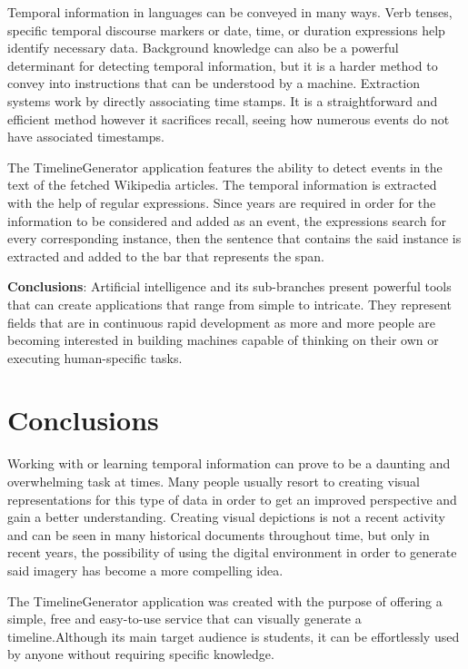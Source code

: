 \documentclass{report}
\begin{document}
Temporal information in languages can be conveyed in many ways. Verb tenses, specific temporal discourse markers or date, time, or duration expressions help identify necessary data. Background knowledge can also be a powerful determinant for detecting temporal information, but it is a harder method to convey into instructions that can be understood by a machine. Extraction systems work by directly associating time stamps. It is a straightforward and efficient method however it sacrifices recall, seeing how numerous events do not have associated timestamps.\par

The TimelineGenerator application features the ability to detect events in the text of the fetched Wikipedia articles. The temporal information is extracted with the help of regular expressions. Since years are required in order for the information to be considered and added as an event, the expressions search for every corresponding instance, then the sentence that contains the said instance is extracted and added to the bar that represents the span.\par

\textbf{Conclusions}: Artificial intelligence and its sub-branches present powerful tools that can create applications that range from simple to intricate. They represent fields that are in continuous rapid development as more and more people are becoming interested in building machines capable of thinking on their own or executing human-specific tasks.
\newpage

\chapter{Conclusions}
Working with or learning temporal information can prove to be a daunting and overwhelming task at times. Many people usually resort to creating visual representations for this type of data in order to get an improved perspective and gain a better understanding. Creating visual depictions is not a recent activity and can be seen in many historical documents throughout time, but only in recent years, the possibility of using the digital environment in order to generate said imagery has become a more compelling idea.\par

The TimelineGenerator application was created with the purpose of offering a simple, free and easy-to-use service that can visually generate a timeline.Although its main target audience is students, it can be effortlessly used by anyone without requiring specific knowledge.\par
\end{document}
